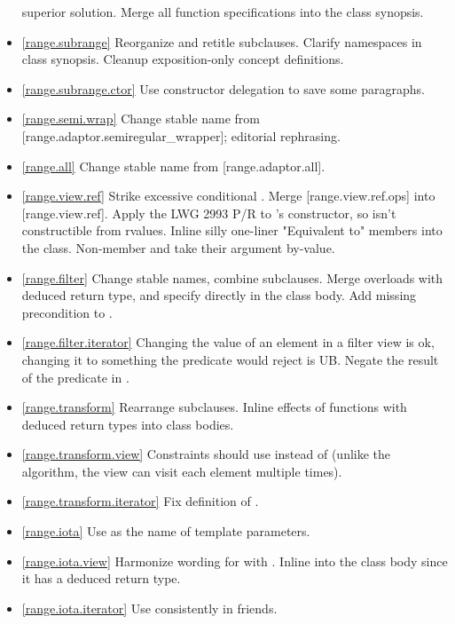 \begin{itemize}
  superior solution.
  Merge all function specifications into the class synopsis.
\item \ref{range.subrange} Reorganize and retitle subclauses.
  Clarify namespaces in class synopsis.
  Cleanup exposition-only concept definitions.
\item \ref{range.subrange.ctor} Use constructor delegation to save some
  paragraphs.
\item \ref{range.semi.wrap} Change stable name from
  [range.adaptor.semiregular_wrapper]; editorial rephrasing.
\item \ref{range.all} Change stable name from [range.adaptor.all].
\item \ref{range.view.ref} Strike excessive conditional .
  Merge [range.view.ref.ops] into [range.view.ref].
  Apply the LWG 2993 P/R to 's constructor, so
   isn't constructible from rvalues.
  Inline silly one-liner "\effects Equivalent to" members into the class.
  Non-member  and  take their argument by-value.
\item \ref{range.filter} Change stable names, combine subclauses.
  Merge  overloads with deduced return type,
  and specify directly in the class body.
  Add missing precondition to .
\item \ref{range.filter.iterator}
  Changing the value of an element in a filter view is ok, changing it to
  something the predicate would reject is UB.
  Negate the result of the predicate in .
\item \ref{range.transform} Rearrange subclauses. Inline effects of functions
  with deduced return types into class bodies.
\item \ref{range.transform.view}
  Constraints should use  instead of 
  (unlike the algorithm, the view can visit each element multiple times).
\item \ref{range.transform.iterator} Fix definition of .
\item \ref{range.iota} Use  as the name of 
  template parameters.
\item \ref{range.iota.view} Harmonize wording for
   with .
  Inline  into the class body since it has a deduced return type.
\item \ref{range.iota.iterator} Use  consistently in friends.

\end{itemize}
